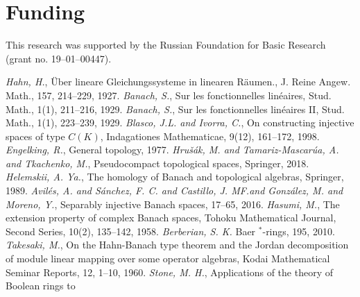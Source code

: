 \documentclass[12pt]{article}
\begin{document}
\section{Funding}\label{SectionFunding} This research was supported by the
Russian Foundation for Basic Research (grant no. 19--01--00447).


\begin{thebibliography}{999}
    \textit{Hahn, H.}, {\"U}ber lineare Gleichungssysteme in linearen
    R{\"a}umen., J. Reine Angew. Math., 157, 214--229, 1927.
    \textit{Banach, S.}, Sur les fonctionnelles lin{\'e}aires, Stud. Math.,
    1(1), 211--216, 1929.
    \textit{Banach, S.}, Sur les fonctionnelles lin{\'e}aires II, Stud. Math.,
    1(1), 223--239, 1929.
    \textit{Blasco, J.L. and Ivorra, C.}, On constructing injective spaces of
    type $C(K)$, Indagationes Mathematicae, 9(12), 161--172, 1998.
    \textit{Engelking, R.}, General topology, 1977.
    \textit{Hru{\v{s}}{\'a}k, M. and Tamariz-Mascar{\'u}a, A. and Tkachenko,
    M.}, Pseudocompact topological spaces, Springer, 2018.
    \textit{Helemskii, A. Ya.}, The homology of Banach and topological algebras,
    Springer, 1989.
    \textit{Avil{\'e}s, A. and S{\'a}nchez, F. C. and Castillo, J. MF.\@ and
        Gonz{\'a}lez, M. and Moreno, Y.}, Separably injective Banach spaces, 17--65,
    2016.
    \textit{Hasumi, M.}, The extension property of complex Banach spaces, Tohoku
    Mathematical Journal, Second Series, 10(2), 135--142, 1958.
    \textit{Berberian, S. K.}
    Baer $^*$-rings, 195, 2010.
    \textit{Takesaki, M.}, On the Hahn-Banach type theorem and the Jordan
    decomposition of module linear mapping over some operator algebras, Kodai
    Mathematical Seminar Reports, 12, 1--10, 1960.
    \textit{Stone, M. H.}, Applications of the theory of Boolean rings to

\end{thebibliography}
\end{document}
